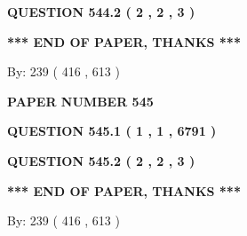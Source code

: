 \documentclass[12pt]{article}
\begin{document}
{\textbf{\Large{QUESTION
544.2 
 ( 2 , 2 , 3 )
}}}
  
  
   
   
 \vspace{0.2in}
 
   
   
   
   
\vspace{1.0in} 
{\textbf{\large{ *** END OF PAPER, THANKS *** }}} 
   
   
\hspace{1.0in} By: 
 239 ( 416 ,  613 )
   
   
   
   
\newpage 
\setcounter{page}{ 
   545001 } 
   
   
   
   
 {\textbf{ \Large{ PAPER NUMBER  545  }}}
   
   
\vspace{0.2in}
   
   
   
   
   
   
 \vspace{0.2in}
 
 
 
 
   
   
  
\vspace{0.2in}
  
{\textbf{\Large{QUESTION
545.1 
 ( 1 , 1 , 6791 )
}}}
  
  
  
\vspace{0.2in}
  
{\textbf{\Large{QUESTION
545.2 
 ( 2 , 2 , 3 )
}}}
  
  
   
   
 \vspace{0.2in}
 
   
   
   
   
\vspace{1.0in} 
{\textbf{\large{ *** END OF PAPER, THANKS *** }}} 
   
   
\hspace{1.0in} By: 
 239 ( 416 ,  613 )
   
   
   
   
\newpage 
\setcounter{page}{ 
   546001 } 
   
   
   
\end{document}
